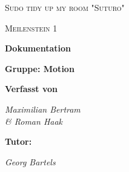 \documentclass[12pt,a4paper]{report}
\begin{document}
\begin{titlepage}
	\centering
	{\scshape\LARGE Sudo tidy up my room "Suturo" \par}
	\vspace{1.5cm}
	{\scshape\Large Meilenstein 1\par}
	\vspace{1.5cm}
	{\huge\bfseries Dokumentation \par}
	\vspace{0.5cm}
	{\LARGE\bfseries Gruppe: Motion \par}	
	\vspace{2.5cm}
	{\normalsize\bfseries Verfasst von \par}
	{\small\itshape Maximilian Bertram\\  \& Roman Haak\par}	
	\vspace{2.5cm}
	{\normalsize\bfseries Tutor: \par}
	{\small\itshape Georg Bartels\par}


	\vfill
\end{titlepage}
\end{document}
